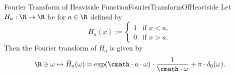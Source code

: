 \begin{mlem}{Fourier Transform of Heaviside Function}{FourierTransformOfHeaviside}
    Let $H_a:\R\to\R$ be for $a\in\R$ defined by 
    \[
        H_a(x) := \begin{cases}
            1 & \text{if } x < a, \\
            0 & \text{if } x > a.
        \end{cases}
    \]
    Then the Fourier transform of $H_a$ is given by
    \[
        \R\ni\omega\mapsto\hat H_a(\omega) = \exp(\cmath\cdot a\cdot \omega)\cdot\frac{1}{\cmath\cdot\omega} + \pi\cdot\delta_0(\omega).
    \]
\end{mlem}  
